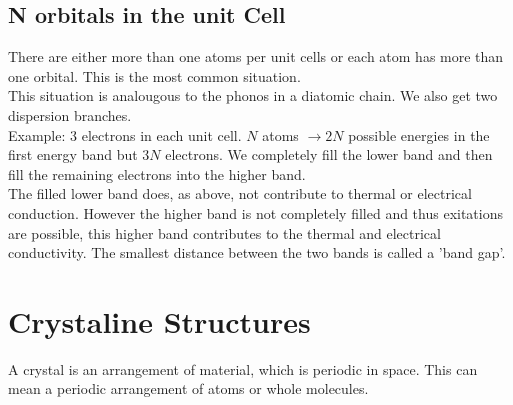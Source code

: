 \documentclass{report}
\begin{document}
\section{N orbitals in the unit Cell}
There are either more than one atoms per unit cells or each atom has more than one orbital. This is the most common situation.\\
This situation is analougous to the phonos in a diatomic chain. We also get two dispersion branches.\\
Example: 3 electrons in each unit cell. $N$ atoms $\to 2N$ possible energies in the first energy band but $3N$ electrons. We completely fill the lower band and then fill the remaining electrons into the higher band.\\
The filled lower band does, as above, not contribute to thermal or electrical conduction. However the higher band is not completely filled and thus exitations are possible, this higher band contributes to the thermal and electrical conductivity. The smallest distance between the two bands is called a 'band gap'.
\chapter{Crystaline Structures}
A crystal is an arrangement of material, which is periodic in space. This can mean a periodic arrangement of atoms or whole molecules.
\end{document}
